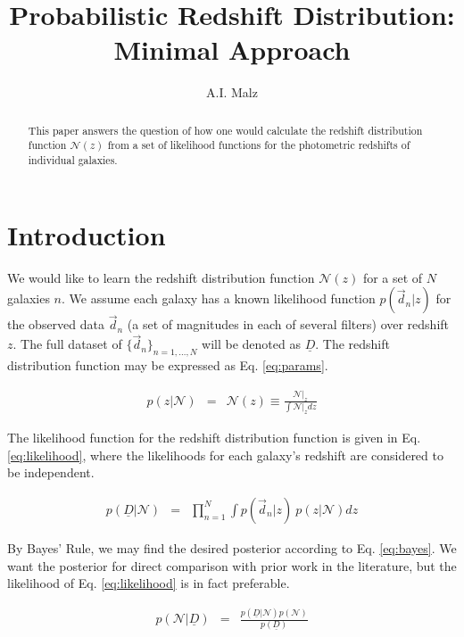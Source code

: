 \documentclass[12pt, onecolumn]{emulateapj}
\newcommand{\textul}{\underline}
\begin{document}
\title{Probabilistic Redshift Distribution: Minimal Approach}

\author{A.I. Malz}

\begin{abstract}
This paper answers the question of how one would calculate the redshift distribution function $\mathcal{N}(z)$ from a set of likelihood functions for the photometric redshifts of individual galaxies.
\end{abstract}


\section{Introduction}

We would like to learn the redshift distribution function $\mathcal{N}(z)$ for a set of $N$ galaxies $n$.  We assume each galaxy has a known likelihood function $p(\vec{d}_{n}|z)$ for the observed data $\vec{d}_{n}$ (a set of magnitudes in each of several filters) over redshift $z$.  The full dataset of $\{\vec{d}_{n}\}_{n=1,\dots,N}$ will be denoted as $\textul{D}$.  The redshift distribution function may be expressed as Eq. \ref{eq:params}.

\begin{eqnarray}
\label{eq:params}
p(z|\mathcal{N}) &=& \mathcal{N}(z) \equiv \frac{\mathcal{N}|_{z}}{\int\mathcal{N}|_{z}dz}
\end{eqnarray}

The likelihood function for the redshift distribution function is given in Eq. \ref{eq:likelihood}, where the likelihoods for each galaxy's redshift are considered to be independent.  

\begin{eqnarray}
\label{eq:likelihood}
p(\textul{D}|\mathcal{N}) &=& \prod_{n=1}^{N}\int p(\vec{d}_{n}|z)\ p(z|\mathcal{N})dz
\end{eqnarray}

By Bayes' Rule, we may find the desired posterior according to Eq. \ref{eq:bayes}.  We want the posterior for direct comparison with prior work in the literature, but the likelihood of Eq. \ref{eq:likelihood} is in fact preferable.

\begin{eqnarray}
\label{eq:bayes}
p(\mathcal{N}|\textul{D}) &=& \frac{p(\textul{D}|\mathcal{N})p(\mathcal{N})}{p(\textul{D})}
\end{eqnarray}
\end{document}

